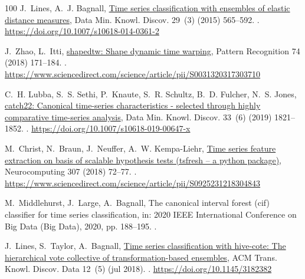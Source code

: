 \documentclass[final,3p,times,twocolumn]{elsarticle}
\begin{document}
\begin{thebibliography}{100}
J.~Lines, A.~J. Bagnall, \href{https://doi.org/10.1007/s10618-014-0361-2}{Time
  series classification with ensembles of elastic distance measures}, Data Min.
  Knowl. Discov. 29~(3) (2015) 565--592.
\newblock \href {https://doi.org/10.1007/S10618-014-0361-2}
  {}.
\newline\urlprefix\url{https://doi.org/10.1007/s10618-014-0361-2}

J.~Zhao, L.~Itti,
  \href{https://www.sciencedirect.com/science/article/pii/S0031320317303710}{shapedtw:
  Shape dynamic time warping}, Pattern Recognition 74 (2018) 171--184.
\newblock \href {https://doi.org/https://doi.org/10.1016/j.patcog.2017.09.020}
  {}.
\newline\urlprefix\url{https://www.sciencedirect.com/science/article/pii/S0031320317303710}

C.~H. Lubba, S.~S. Sethi, P.~Knaute, S.~R. Schultz, B.~D. Fulcher, N.~S. Jones,
  \href{https://doi.org/10.1007/s10618-019-00647-x}{catch22: Canonical
  time-series characteristics - selected through highly comparative time-series
  analysis}, Data Min. Knowl. Discov. 33~(6) (2019) 1821--1852.
\newblock \href {https://doi.org/10.1007/S10618-019-00647-X}
  {}.
\newline\urlprefix\url{https://doi.org/10.1007/s10618-019-00647-x}

M.~Christ, N.~Braun, J.~Neuffer, A.~W. Kempa-Liehr,
  \href{https://www.sciencedirect.com/science/article/pii/S0925231218304843}{Time
  series feature extraction on basis of scalable hypothesis tests (tsfresh –
  a python package)}, Neurocomputing 307 (2018) 72--77.
\newblock \href {https://doi.org/https://doi.org/10.1016/j.neucom.2018.03.067}
  {}.
\newline\urlprefix\url{https://www.sciencedirect.com/science/article/pii/S0925231218304843}

M.~Middlehurst, J.~Large, A.~Bagnall, The canonical interval forest (cif)
  classifier for time series classification, in: 2020 IEEE International
  Conference on Big Data (Big Data), 2020, pp. 188--195.
\newblock \href {https://doi.org/10.1109/BigData50022.2020.9378424}
  {}.

J.~Lines, S.~Taylor, A.~Bagnall, \href{https://doi.org/10.1145/3182382}{Time
  series classification with hive-cote: The hierarchical vote collective of
  transformation-based ensembles}, ACM Trans. Knowl. Discov. Data 12~(5) (jul
  2018).
\newblock \href {https://doi.org/10.1145/3182382} {}.
\newline\urlprefix\url{https://doi.org/10.1145/3182382}


\end{thebibliography}
\end{document}
